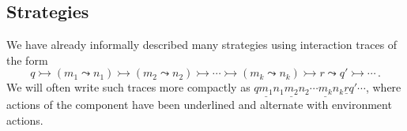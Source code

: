 \documentclass[acmsmall,nonacm]{acmart}
\begin{document}



\subsection{Strategies} \label{sec:model:strat} %

We have already informally described many strategies
using interaction traces of the form
\[
  q \rightarrowtail
  (m_1 \leadsto n_1) \rightarrowtail
  (m_2 \leadsto n_2) \rightarrowtail
  \cdots \rightarrowtail
  (m_k \leadsto n_k) \rightarrowtail
  r
  \leadsto
  q' \rightarrowtail
  \cdots
  \,.
\]
We will often write such traces more compactly as
$
 q \underline{m_1} n_1
   \underline{m_2} n_2 \cdots
   \underline{m_k} n_k \underline{r}
 q' \cdots
$,
where actions of the component have been underlined
and alternate with environment actions.
\end{document}
